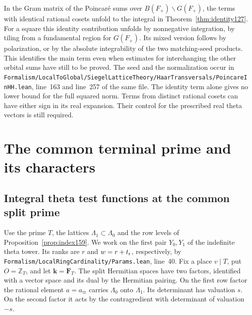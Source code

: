 \documentclass[a4paper,11pt]{article}
\theoremstyle{definition}
\theoremstyle{remark}
\newcommand{\ZZ}{\mathbb Z}\newcommand{\ord}{\operatorname{ord}}
\newcommand{\srcloc}[2]{{\small\nolinkurl{#1.lean}}, line~#2}
\numberwithin{equation}{section}
\begin{document}
In the Gram matrix of the Poincar\'e sums over
\(B(F_+)\backslash G(F_+)\), the terms with identical rational
cosets unfold to the integral in Theorem~\ref{thm:identity127}.
For a square this identity contribution unfolds by nonnegative
integration, by tiling from a fundamental region for \(G(F_+)\).
Its mixed version follows by polarization, or by the absolute
integrability of the two matching-seed products. This identifies
the main term even when estimates for interchanging the other
orbital sums have still to be proved. The seed and the normalization
occur in \srcloc{Formalism/LocalToGlobal/SiegelLatticeTheory/HaarTransversals/PoincareInHH}{163}
and line~257 of the same file. The identity term alone gives no
lower bound for the full squared norm. Terms from distinct rational
cosets can have either sign in its real expansion. Their control
for the prescribed real theta vectors is still required.

\section{The common terminal prime and its characters}\label{nav:g-VIII-1}

\subsection{Integral theta test functions at the common split prime}\label{nav:VII-10}
\label{sec:split161}

Use the prime \(T\), the lattices \(\Lambda_1\subset\Lambda_0\)
and the row levels of Proposition~\ref{prop:index159}. We work on
the first pair \(Y_0,Y_1\) of the indefinite theta tower. Its ranks
are \(r\) and \(w=r+t_{\rm r}\), respectively, by
\srcloc{Formalism/LocalRingCardinality/Params}{40}. Fix a
place \(v\mid T\), put \(O=\ZZ_T\), and let \(\mathbf k=\mathbf F_T\).
The split Hermitian spaces have two factors, identified with a
vector space and its dual by the Hermitian pairing. On the first
row factor the rational element \(a=a_\varpi\) carries
\(\Lambda_0\) onto \(\Lambda_1\). Its determinant has valuation
\(s\). On the second factor it acts by the contragredient with
determinant of valuation \(-s\).
\end{document}
